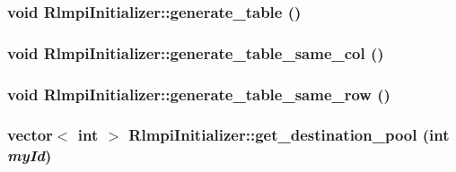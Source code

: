 \hypertarget{classRlmpiInitializer_a74b0f63a73cf39fb85072aeb1580d562}{
\subsubsection[{generate\_\-table}]{\setlength{\rightskip}{0pt plus 5cm}void RlmpiInitializer::generate\_\-table ()}}
\label{classRlmpiInitializer_a74b0f63a73cf39fb85072aeb1580d562}
\hypertarget{classRlmpiInitializer_aacafe4bfcbd2d27b6c63904ac431c966}{
\subsubsection[{generate\_\-table\_\-same\_\-col}]{\setlength{\rightskip}{0pt plus 5cm}void RlmpiInitializer::generate\_\-table\_\-same\_\-col ()}}
\label{classRlmpiInitializer_aacafe4bfcbd2d27b6c63904ac431c966}
\hypertarget{classRlmpiInitializer_ad1b5f8433f2f02756f4f522d552b8c0c}{
\subsubsection[{generate\_\-table\_\-same\_\-row}]{\setlength{\rightskip}{0pt plus 5cm}void RlmpiInitializer::generate\_\-table\_\-same\_\-row ()}}
\label{classRlmpiInitializer_ad1b5f8433f2f02756f4f522d552b8c0c}
\hypertarget{classRlmpiInitializer_a4b50739703f39a77d03b223ac5f79cf6}{
\subsubsection[{get\_\-destination\_\-pool}]{\setlength{\rightskip}{0pt plus 5cm}vector$<$ int $>$ RlmpiInitializer::get\_\-destination\_\-pool (int {\em myId})}}
\label{classRlmpiInitializer_a4b50739703f39a77d03b223ac5f79cf6}
